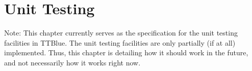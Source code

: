 \chapter{Unit Testing}

Note: This chapter currently serves as the specification for the unit testing facilities in TTBlue.  The unit testing facilities are only partially (if at all) implemented.  Thus, this chapter is detailing how it should work in the future, and not necessarily how it works right now.


